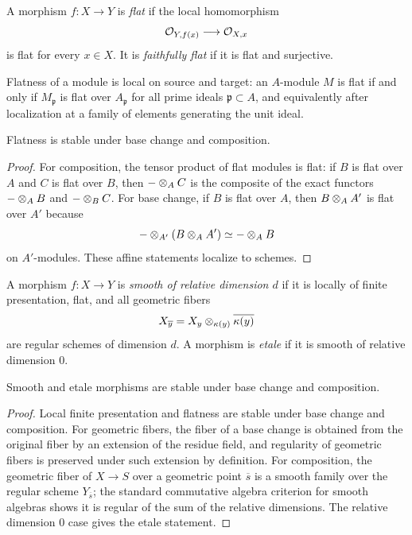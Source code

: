 \begin{definition}
A morphism \(f:X\to Y\) is \emph{flat} if the local homomorphism
\[
    \mathcal{O}_{Y,f(x)}\longrightarrow \mathcal{O}_{X,x}
\]
is flat for every \(x\in X\).  It is \emph{faithfully flat} if it is flat and
surjective.
\end{definition}

\begin{fact}
Flatness of a module is local on source and target: an \(A\)-module \(M\) is
flat if and only if \(M_{\mathfrak p}\) is flat over \(A_{\mathfrak p}\) for
all prime ideals \(\mathfrak p\subset A\), and equivalently after localization
at a family of elements generating the unit ideal.
\end{fact}

\begin{proposition}
Flatness is stable under base change and composition.
\end{proposition}

\begin{proof}
For composition, the tensor product of flat modules is flat: if \(B\) is flat
over \(A\) and \(C\) is flat over \(B\), then \(-\otimes_A C\) is the composite
of the exact functors \(-\otimes_A B\) and \(-\otimes_B C\).  For base change,
if \(B\) is flat over \(A\), then \(B\otimes_A A'\) is flat over \(A'\) because
\[
    -\otimes_{A'}(B\otimes_A A')\simeq -\otimes_A B
\]
on \(A'\)-modules.  These affine statements localize to schemes.
\end{proof}

\begin{definition}
A morphism \(f:X\to Y\) is \emph{smooth of relative dimension \(d\)} if it is
locally of finite presentation, flat, and all geometric fibers
\[
    X_{\overline y}=X_y\otimes_{\kappa(y)}\overline{\kappa(y)}
\]
are regular schemes of dimension \(d\).  A morphism is \emph{etale} if it is
smooth of relative dimension \(0\).
\end{definition}

\begin{proposition}
Smooth and etale morphisms are stable under base change and composition.
\end{proposition}

\begin{proof}
Local finite presentation and flatness are stable under base change and
composition.  For geometric fibers, the fiber of a base change is obtained from
the original fiber by an extension of the residue field, and regularity of
geometric fibers is preserved under such extension by definition.  For
composition, the geometric fiber of \(X\to S\) over a geometric point
\(\overline s\) is a smooth family over the regular scheme
\(Y_{\overline s}\); the standard commutative algebra criterion for smooth
algebras shows it is regular of the sum of the relative dimensions.  The
relative dimension \(0\) case gives the etale statement.
\end{proof}

